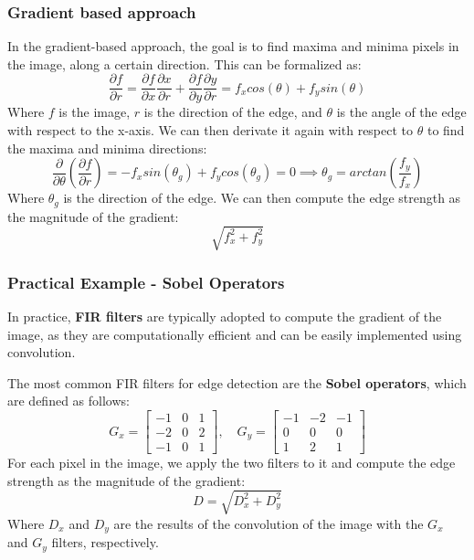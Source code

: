 \subsubsection{Gradient based approach}
In the gradient-based approach, the goal is to find maxima and minima pixels in the image, along a certain direction.
This can be formalized as:
\begin{equation}
    \frac{\partial f}{\partial r} = \frac{\partial f}{\partial x} \frac{\partial x}{\partial r} + \frac{\partial f}{\partial y} \frac{\partial y}{\partial r} = f_x cos(\theta) + f_y sin(\theta)
\end{equation}
Where $f$ is the image, $r$ is the direction of the edge, and $\theta$ is the angle of the edge with respect to the x-axis.
We can then derivate it again with respect to $\theta$ to find the maxima and minima directions:
\begin{equation}
    \frac{\partial}{\partial \theta} \left( \frac{\partial f}{\partial r} \right) = -f_x sin(\theta_g) + f_y cos(\theta_g) = 0 \implies \theta_g = arctan\left( \frac{f_y}{f_x} \right)
\end{equation}
Where $\theta_g$ is the direction of the edge. We can then compute the edge strength as the magnitude of the gradient:
\begin{equation}
    \sqrt{f_x^2 + f_y^2}
\end{equation}

\subsubsection{Practical Example - Sobel Operators}
In practice, \textbf{FIR filters} are typically adopted to compute the gradient of the image, as they are computationally efficient
and can be easily implemented using convolution.

The most common FIR filters for edge detection are the \textbf{Sobel operators}, which are defined as follows:
\begin{equation}
    G_x = \begin{bmatrix}
    -1 & 0 & 1 \\
    -2 & 0 & 2 \\
    -1 & 0 & 1
    \end{bmatrix}, \quad
    G_y = \begin{bmatrix}
    -1 & -2 & -1 \\
    0 & 0 & 0 \\
    1 & 2 & 1
    \end{bmatrix}
\end{equation}
For each pixel in the image, we apply the two filters to it and compute the edge strength as the magnitude of the gradient:
\begin{equation}
    D = \sqrt{ D_x^2 + D_y^2}
\end{equation}
Where $D_x$ and $D_y$ are the results of the convolution of the image with the $G_x$ and $G_y$ filters, respectively.
 
